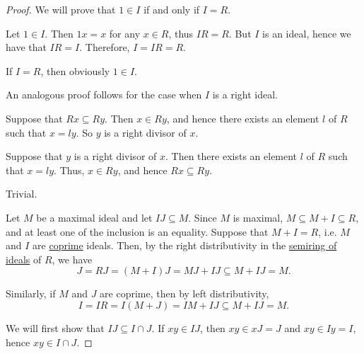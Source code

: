 \begin{proof}
   We will prove that \( 1 \in I \) if and only if \( I = R \).

  \SufficiencySubProof* Let \( 1 \in I \). Then \( 1x = x \) for any \( x \in R \), thus \( IR = R \). But \( I \) is an ideal, hence we have that \( IR = I \). Therefore, \( I = IR = R \).

  \NecessitySubProof* If \( I = R \), then obviously \( 1 \in I \).

  An analogous proof follows for the case when \( I \) is a right ideal.


  \SufficiencySubProof* Suppose that \( Rx \subseteq Ry \). Then \( x \in Ry \), and hence there exists an element \( l \) of \( R \) such that \( x = ly \). So \( y \) is a right divisor of \( x \).

  \NecessitySubProof* Suppose that \( y \) is a right divisor of \( x \). Then there exists an element \( l \) of \( R \) such that \( x = ly \). Thus, \( x \in Ry \), and hence \( Rx \subseteq Ry \).

   Trivial.

   Let \( M \) be a maximal ideal and let \( IJ \subseteq M \). Since \( M \) is maximal, \( M \subseteq M + I \subseteq R \), and at least one of the inclusion is an equality. Suppose that \( M + I = R \), i.e. \( M \) and \( I \) are \hyperref[def:semiring_ideal/coprime]{coprime} ideals. Then, by the right distributivity in the \hyperref[thm:semiring_of_ideals/lattice]{semiring of ideals} of \( R \), we have
  \begin{equation*}
    J = RJ = (M + I)J = MJ + IJ \subseteq M + IJ = M.
  \end{equation*}

  Similarly, if \( M \) and \( J \) are coprime, then by left distributivity,
  \begin{equation*}
    I = IR = I(M + J) = IM + IJ \subseteq M + IJ = M.
  \end{equation*}

   We will first show that \( IJ \subseteq I \cap J \). If \( xy \in IJ \), then \( xy \in xJ = J \) and \( xy \in Iy = I \), hence \( xy \in I \cap J \).


\end{proof}
